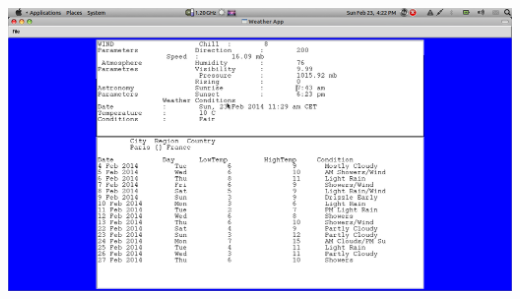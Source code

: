 \documentclass[a4paper,12pt]{report}
\begin{document}
\begin{center}
 \includegraphics[width=17 cm,height=20 cm]{./Screenshot.png}

\end{center}
\end{document}
